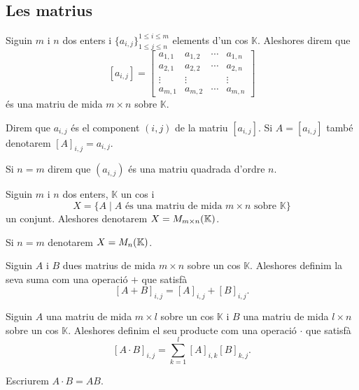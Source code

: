 \documentclass[../../Main.tex]{subfiles}
\begin{document}
	\subsection{Les matrius}
	\begin{definition}[Matriu]
		\label{def:matriu}
		\label{def:matriu quadrada}
		Siguin \(m\) i \(n\) dos enters i \(\{a_{i,j}\}^{1\leq i\leq m}_{1\leq j\leq n}\) elements d'un cos \(\mathbb{K}\). Aleshores direm que
		\[[a_{i,j}]=
		\left[\begin{matrix}
		a_{1,1} & a_{1,2} & \cdots & a_{1,n} \\
		a_{2,1} & a_{2,2} & \cdots & a_{2,n} \\
		\vdots & \vdots &  & \vdots \\
		a_{m,1} & a_{m,2} & \cdots & a_{m,n}
		\end{matrix}\right]\]
		és una matriu de mida \(m\times n\) sobre \(\mathbb{K}\).
		
		Direm que \(a_{i,j}\) és el component \((i,j)\) de la matriu \([a_{i,j}]\). Si \(A=[a_{i,j}]\) també denotarem \([A]_{i,j}=a_{i,j}\).
		
		Si \(n=m\) direm que \((a_{i,j})\) és una matriu quadrada d'ordre \(n\).
	\end{definition}
	\begin{notation}
		\label{notation:conjunt de matrius}
		Siguin \(m\) i \(n\) dos enters, \(\mathbb{K}\) un cos i
		\[
		    X=\{A\mid A\text{ és una matriu de mida }m\times n\text{ sobre }\mathbb{K}\}
		\]
		un conjunt. Aleshores denotarem \(X=M_{m\times n}(\mathbb{K})\).
		
		Si \(n=m\) denotarem \(X=M_{n}(\mathbb{K})\).
	\end{notation}
	\begin{definition}
		\label{def:suma de matrius}
		Siguin \(A\) i \(B\) dues matrius de mida \(m\times n\) sobre un cos \(\mathbb{K}\). Aleshores definim la seva suma com una operació \(+\) que satisfà
		\[
		    [A+B]_{i,j}=[A]_{i,j}+[B]_{i,j}.
		\]
	\end{definition}
	\begin{definition}
		\label{def:producte de matrius}
		Siguin \(A\) una matriu de mida \(m\times l\) sobre un cos \(\mathbb{K}\) i \(B\) una matriu de mida \(l\times n\) sobre un cos \(\mathbb{K}\). Aleshores definim el seu producte com una operació \(\cdot\) que satisfà
		\[
		    [A\cdot B]_{i,j}=\sum_{k=1}^{l}[A]_{i,k}[B]_{k,j}.
		\]
		
		Escriurem \(A\cdot B=AB\).
	\end{definition}
\end{document}
